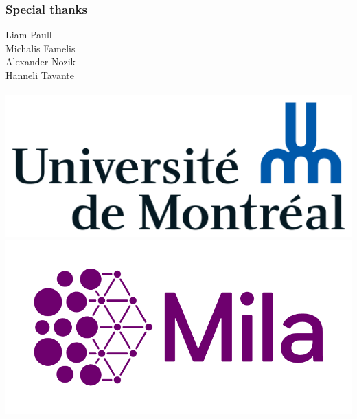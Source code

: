 \documentclass{beamer}
\begin{document}
    \begin{frame}
        \frametitle{Special thanks}
        \begin{itemize}
            \begin{center}
                \huge{
                Liam Paull \\
                Michalis Famelis \\
                Alexander Nozik \\
                Hanneli Tavante \\~\\
                }
                \includegraphics[scale=0.1]{udem.png}
                \includegraphics[scale=0.4]{mila.png}
            \end{center}
        \end{itemize}
    \end{frame}
\end{document}
